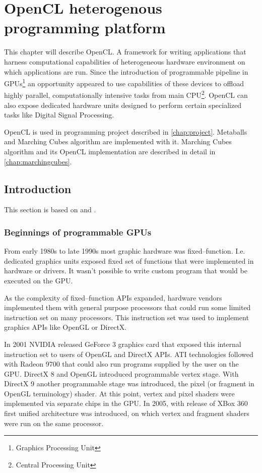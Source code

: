 \chapter{OpenCL heterogenous programming platform}
This chapter will describe OpenCL. A framework for writing applications that
harness computational capabilities of heterogeneous hardware environment on
which applications are run. Since the introduction of programmable pipeline
in GPUs\footnote{Graphics Processing Unit} an opportunity appeared to use
capabilities of these devices to offload highly parallel, computationally
intensive tasks from main CPU\footnote{Central Processing Unit}. OpenCL can also
expose dedicated hardware units designed to perform certain specialized tasks
like Digital Signal Processing.

OpenCL is used in programming project described in \autoref{chap:project}.
Metaballs and Marching Cubes algorithm are implemented with it. Marching Cubes
algorithm and its OpenCL implementation are described in detail in
\autoref{chap:marchingcubes}.

\section{Introduction}
This section is based on \cite{Kirk:2010:PMP:1841511} and
\cite{gaster2012heterogeneous}.

\subsection{Beginnings of programmable GPUs}

From early 1980s to late 1990s most graphic hardware was fixed--function.
I.e. dedicated graphics units exposed fixed set of functions that were
implemented in hardware or drivers. It wasn't possible to write custom program
that would be executed on the GPU.

As the complexity of fixed--function APIs expanded, hardware vendors implemented
them with general purpose processors that could run some limited instruction set
on many processors. This instruction set was used to implement graphics APIs
like OpenGL or DirectX.

In 2001 NVIDIA released GeForce 3 graphics card that exposed this internal
instruction set to users of OpenGL and DirectX APIs. ATI technologies followed
with Radeon 9700 that could also run programs supplied by the user on the GPU.
DirectX 8 and OpenGL introduced programmable vertex stage. With
DirectX 9 another programmable stage was introduced, the pixel (or fragment in
OpenGL terminology) shader. At this point, vertex and pixel shaders were
implemented via separate chips in the GPU. In 2005, with release of XBox 360
first unified architecture was introduced, on which vertex and fragment shaders
were run on the same processor.

